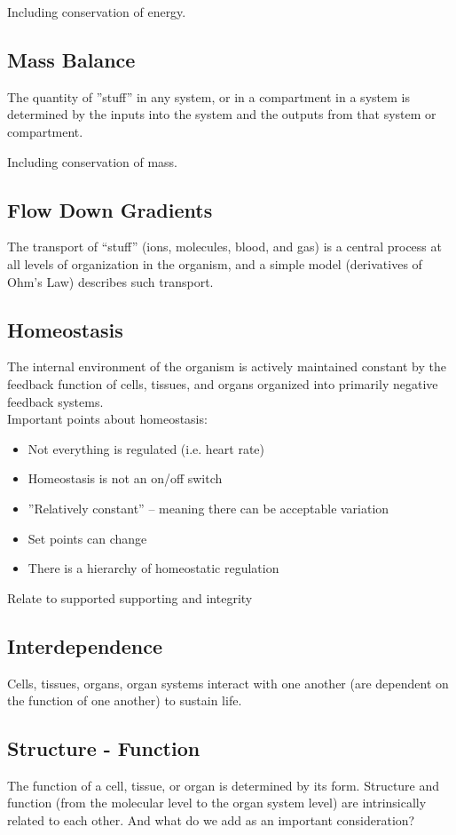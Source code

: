 Including conservation of energy.

\subsection{Mass Balance}
The quantity of ”stuff” in any system, or in a compartment in a system is determined by the inputs into the system and the outputs from that system or compartment.

Including conservation of mass.

\subsection{Flow Down Gradients}
The transport of “stuff” (ions, molecules, blood, and gas) is a central process at all levels of organization in the organism, and a simple model (derivatives of Ohm’s Law) describes such transport.

\subsection{Homeostasis}
The internal environment of the organism is actively maintained constant by the feedback function of cells, tissues, and organs organized into primarily negative feedback systems.\\
Important points about homeostasis:
\begin{itemize}
    \item Not everything is regulated (i.e. heart rate)
    \item Homeostasis is not an on/off switch
    \item ”Relatively constant” – meaning there can be acceptable variation
    \item Set points can change
    \item There is a hierarchy of homeostatic regulation
\end{itemize}

Relate to supported supporting and integrity

\subsection{Interdependence}
Cells, tissues, organs, organ systems interact with one another (are dependent on the function of one another) to sustain life.

\subsection{Structure - Function}
The function of a cell, tissue, or organ is determined by its form. Structure and function (from the molecular level to the organ system level) are intrinsically related to each other. 
And what do we add as an important consideration?


